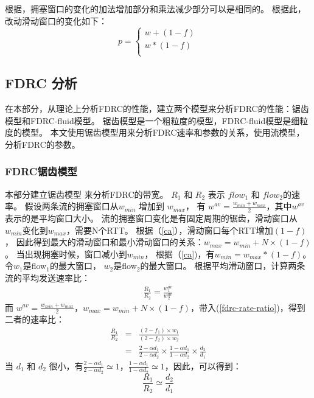 根据\cite{LPD}，拥塞窗口的变化的加法增加部分和乘法减少部分可以是相同的。
根据此，改动滑动窗口的变化如下：
\begin{equation}
\label{ca}
 p=\left\{
\begin{array}{rcl}
w+(1-f)\\
w*(1-f) \\
\end{array} \right. 
\end{equation}


\subsection{FDRC 分析}
在本部分，从理论上分析FDRC的性能，建立两个模型来分析FDRC的性能：锯齿模型和FDRC-fluid模型。
锯齿模型是一个粗粒度的模型，FDRC-fluid模型是细粒度的模型。
本文使用锯齿模型用来分析FDRC速率和参数的关系，使用流模型，分析FDRC的参数。

\subsubsection{FDRC锯齿模型}
本部分建立锯齿模型\cite{LPD} 来分析FDRC的带宽。
$R_{1}$ 和 $R_{2}$ 表示 $flow_1$ 和 $flow_2$的速率。
假设两条流的拥塞窗口从$w_{min}$ 增加到 $w_{max}$，
有 $w^{av}=\frac{w_{min}+w_{max}}{2}$，其中$w^{av}$表示的是平均窗口大小。
流的拥塞窗口变化是有固定周期的锯齿，滑动窗口从$w_{min}$变化到$w_{max}$，需要N个RTT。
根据（\ref{ca}），滑动窗口每个RTT增加$(1-f)$，
因此得到最大的滑动窗口和最小滑动窗口的关系：$w_{max}=w_{min}+N \times(1-f)$。
当出现拥塞时候，窗口减小到$w_{min}$，
根据（\ref{ca})，有$w_{min}=w_{max}*(1-f)$。
令$w_{1}$是flow$_1$的最大窗口，
$w_{2}$是flow$_2$的最大窗口。
根据平均滑动窗口，计算两条流的平均发送速率比：
\begin{eqnarray}\label{fdrc-rate-ratio}
\frac{R_{1}}{R_{2}} =\frac{w^{av}_1}{w^{av}_2}
\end{eqnarray}
而 $w^{av}=\frac{w_{min}+w_{max}}{2}$，$w_{max}=w_{min}+N \times(1-f)$，带入(\ref{fdrc-rate-ratio})，得到二者的速率比：
\begin{eqnarray}\label{fdrc-rate-ratio2}
\frac{R_{1}}{R_{2}} &=&\frac{(2-f_1)\times w_1}{(2-f_2)\times w_2}  \nonumber \\
&=& \frac{2-\alpha d_1}{2-\alpha d_2}\times \frac{1-\alpha d_1}{1-
\alpha d_2}\times \frac{d_2}{d_1}\nonumber
\end{eqnarray}
当 $d_1$ 和 $d_2$ 很小，有$ \frac{2-\alpha d_1}{2-\alpha d_2}\simeq 1$，$ \frac{1-\alpha d_1}{1-
\alpha d_2}\simeq 1$，因此，可以得到：
\begin{equation}
\label{Ratio}
\frac{R_1}{R_2} \simeq \frac{d_2}{d_1}
\end{equation}

